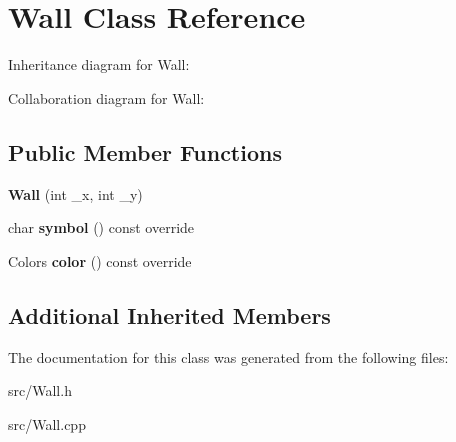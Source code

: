 \hypertarget{class_wall}{}\section{Wall Class Reference}
\label{class_wall}


Inheritance diagram for Wall\+:


Collaboration diagram for Wall\+:
\subsection*{Public Member Functions}
\begin{DoxyCompactItemize}
\item 
\mbox{\label{class_wall_a439ef218364ba6062b465890529c771e}} 
{\bfseries Wall} (int \+\_\+x, int \+\_\+y)
\item 
\mbox{\label{class_wall_a65c9265b4188b2117223bf75cea26d5e}} 
char {\bfseries symbol} () const override
\item 
\mbox{\label{class_wall_a4fbc9ac8324ca521b82a8249c3016ff2}} 
Colors {\bfseries color} () const override
\end{DoxyCompactItemize}
\subsection*{Additional Inherited Members}


The documentation for this class was generated from the following files\+:\begin{DoxyCompactItemize}
\item 
src/Wall.\+h\item 
src/Wall.\+cpp\end{DoxyCompactItemize}
